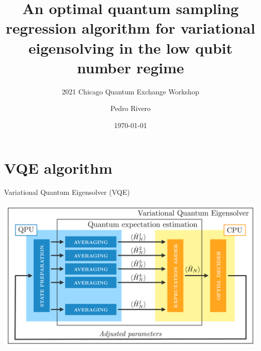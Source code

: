 \documentclass[9pt, handout, aspectratio=169]{beamer}	%
\title{An optimal quantum sampling regression algorithm for variational eigensolving in the low qubit number regime}
\subtitle{2021 Chicago Quantum Exchange Workshop}
\author{Pedro Rivero}
\institute{Illinois Institute of Technology \\ Argonne National Laboratory}
\date{\today}
\begin{document}
	\justify
	\setlength{\abovedisplayskip}{0pt}
	\setlength{\belowdisplayskip}{12pt}
	\setlength{\abovedisplayshortskip}{0pt}
	\setlength{\belowdisplayshortskip}{12pt}

\begin{frame}[plain,t]
	\titlepage
\end{frame}




\section{VQE algorithm}

\begin{frame}{Variational Quantum Eigensolver (VQE)}

	\begin{center}
		\includegraphics[width=.7\paperwidth]{Figures/VQE}
	\end{center}

\end{frame}

\end{document}
